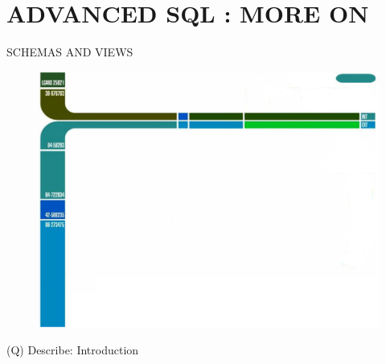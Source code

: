 \documentclass[12pt]{article}
\begin{document}
\section{ADVANCED SQL : MORE ON }
SCHEMAS AND VIEWS\\
\begin{figure}[H]
\includegraphics[width=0.5\linewidth]{page3-image-1.png}
\end{figure}
\clearpage
(Q)
Describe: Introduction
\\ 
 \\
\end{document}
